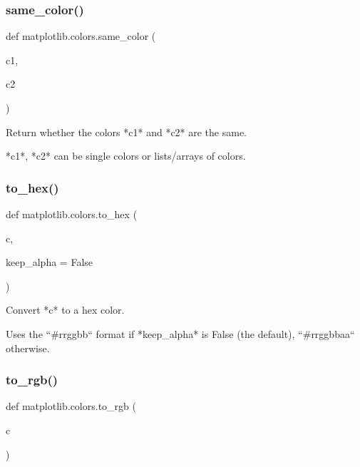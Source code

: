 \subsubsection{\texorpdfstring{same\+\_\+color()}{same\_color()}}
{\footnotesize\ttfamily def matplotlib.\+colors.\+same\+\_\+color (\begin{DoxyParamCaption}\item[{}]{c1,  }\item[{}]{c2 }\end{DoxyParamCaption})}

\begin{DoxyVerb}Return whether the colors *c1* and *c2* are the same.

*c1*, *c2* can be single colors or lists/arrays of colors.
\end{DoxyVerb}
 \mbox{\label{namespacematplotlib_1_1colors_a7ddf4279539e8252678d727599925336}} 
\subsubsection{\texorpdfstring{to\+\_\+hex()}{to\_hex()}}
{\footnotesize\ttfamily def matplotlib.\+colors.\+to\+\_\+hex (\begin{DoxyParamCaption}\item[{}]{c,  }\item[{}]{keep\+\_\+alpha = {\ttfamily False} }\end{DoxyParamCaption})}

\begin{DoxyVerb}Convert *c* to a hex color.

Uses the ``#rrggbb`` format if *keep_alpha* is False (the default),
``#rrggbbaa`` otherwise.
\end{DoxyVerb}
 \mbox{\label{namespacematplotlib_1_1colors_a131bb01614d6474f3031c00026bd93ec}} 
\subsubsection{\texorpdfstring{to\+\_\+rgb()}{to\_rgb()}}
{\footnotesize\ttfamily def matplotlib.\+colors.\+to\+\_\+rgb (\begin{DoxyParamCaption}\item[{}]{c }\end{DoxyParamCaption})}

